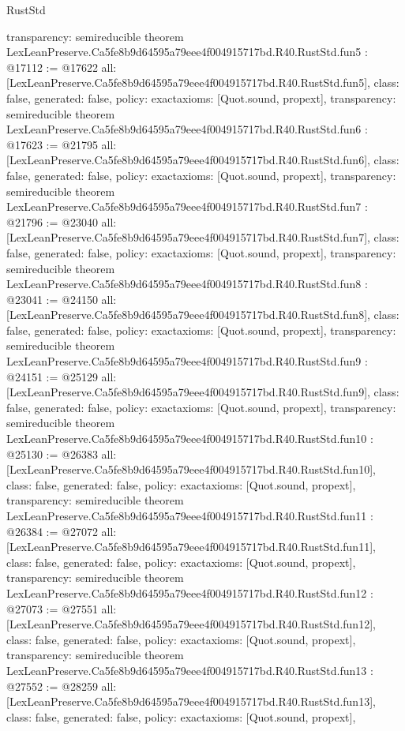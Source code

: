 \begin{lexlean}{RustStd}
\begin{coremodule}
{  transparency: semireducible
}
theorem LexLeanPreserve.Ca5fe8b9d64595a79eee4f004915717bd.R40.RustStd.fun5 : @17112 := @17622 {
  all: [LexLeanPreserve.Ca5fe8b9d64595a79eee4f004915717bd.R40.RustStd.fun5],
  class: false,
  generated: false,
  policy: exact{axioms: [Quot.sound, propext]},
  transparency: semireducible
}
theorem LexLeanPreserve.Ca5fe8b9d64595a79eee4f004915717bd.R40.RustStd.fun6 : @17623 := @21795 {
  all: [LexLeanPreserve.Ca5fe8b9d64595a79eee4f004915717bd.R40.RustStd.fun6],
  class: false,
  generated: false,
  policy: exact{axioms: [Quot.sound, propext]},
  transparency: semireducible
}
theorem LexLeanPreserve.Ca5fe8b9d64595a79eee4f004915717bd.R40.RustStd.fun7 : @21796 := @23040 {
  all: [LexLeanPreserve.Ca5fe8b9d64595a79eee4f004915717bd.R40.RustStd.fun7],
  class: false,
  generated: false,
  policy: exact{axioms: [Quot.sound, propext]},
  transparency: semireducible
}
theorem LexLeanPreserve.Ca5fe8b9d64595a79eee4f004915717bd.R40.RustStd.fun8 : @23041 := @24150 {
  all: [LexLeanPreserve.Ca5fe8b9d64595a79eee4f004915717bd.R40.RustStd.fun8],
  class: false,
  generated: false,
  policy: exact{axioms: [Quot.sound, propext]},
  transparency: semireducible
}
theorem LexLeanPreserve.Ca5fe8b9d64595a79eee4f004915717bd.R40.RustStd.fun9 : @24151 := @25129 {
  all: [LexLeanPreserve.Ca5fe8b9d64595a79eee4f004915717bd.R40.RustStd.fun9],
  class: false,
  generated: false,
  policy: exact{axioms: [Quot.sound, propext]},
  transparency: semireducible
}
theorem LexLeanPreserve.Ca5fe8b9d64595a79eee4f004915717bd.R40.RustStd.fun10 : @25130 := @26383 {
  all: [LexLeanPreserve.Ca5fe8b9d64595a79eee4f004915717bd.R40.RustStd.fun10],
  class: false,
  generated: false,
  policy: exact{axioms: [Quot.sound, propext]},
  transparency: semireducible
}
theorem LexLeanPreserve.Ca5fe8b9d64595a79eee4f004915717bd.R40.RustStd.fun11 : @26384 := @27072 {
  all: [LexLeanPreserve.Ca5fe8b9d64595a79eee4f004915717bd.R40.RustStd.fun11],
  class: false,
  generated: false,
  policy: exact{axioms: [Quot.sound, propext]},
  transparency: semireducible
}
theorem LexLeanPreserve.Ca5fe8b9d64595a79eee4f004915717bd.R40.RustStd.fun12 : @27073 := @27551 {
  all: [LexLeanPreserve.Ca5fe8b9d64595a79eee4f004915717bd.R40.RustStd.fun12],
  class: false,
  generated: false,
  policy: exact{axioms: [Quot.sound, propext]},
  transparency: semireducible
}
theorem LexLeanPreserve.Ca5fe8b9d64595a79eee4f004915717bd.R40.RustStd.fun13 : @27552 := @28259 {
  all: [LexLeanPreserve.Ca5fe8b9d64595a79eee4f004915717bd.R40.RustStd.fun13],
  class: false,
  generated: false,
  policy: exact{axioms: [Quot.sound, propext]},
}
\end{coremodule}
\end{lexlean}
